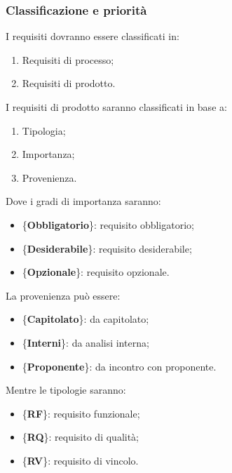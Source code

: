 {{			\subsubsection{Classificazione e priorità}{
				I requisiti dovranno essere classificati in:
				\begin{enumerate}
					\item Requisiti\ped{g} di processo;
					\item Requisiti di prodotto.
				\end{enumerate}
				I requisiti di prodotto saranno classificati in base a:
				\begin{enumerate}
					\item Tipologia;
					\item Importanza;
					\item Provenienza.
				\end{enumerate}
				Dove i gradi di importanza saranno:
				\begin{itemize}
						\item \{\textbf{Obbligatorio}\}: requisito obbligatorio;
						\item \{\textbf{Desiderabile}\}: requisito desiderabile;
						\item \{\textbf{Opzionale}\}: requisito opzionale.
				\end{itemize}
				La provenienza può essere:
				\begin{itemize}
					\item \{\textbf{Capitolato}\}: da capitolato;
					\item \{\textbf{Interni}\}: da analisi interna;
					\item \{\textbf{Proponente}\}: da incontro con proponente.
				\end{itemize}
				Mentre le tipologie saranno:
				\begin{itemize}
					\item \{\textbf{RF}\}: requisito funzionale;
					\item \{\textbf{RQ}\}: requisito di qualità;
					\item \{\textbf{RV}\}: requisito di vincolo.
				\end{itemize}
			}
}}

